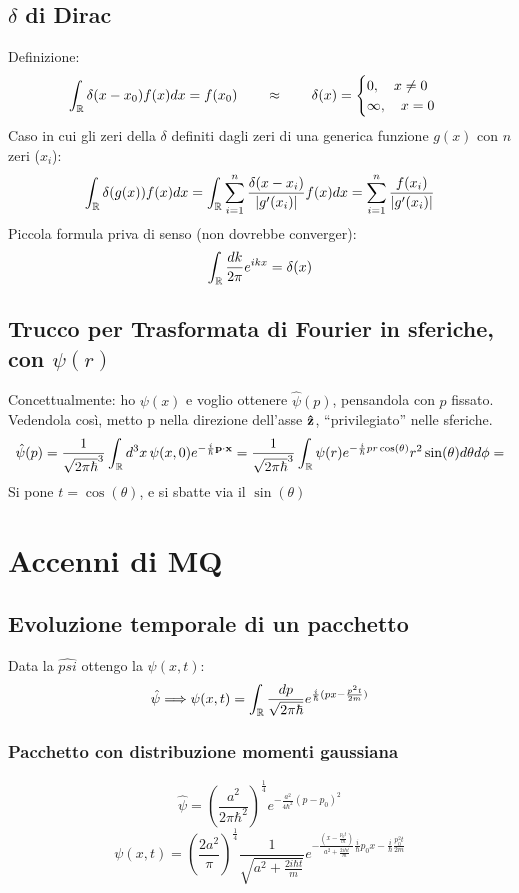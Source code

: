 \subsection{$\delta$ di Dirac}
Definizione:
$$
\int_\mathbb{R} \delta(x-x_0)f(x)dx = f(x_0) \qquad \approx  \qquad 
\delta(x) = \begin{cases}
            0,\quad x\neq0 \\
	    \infty, \quad  x= 0 
\end{cases}
$$
Caso in cui gli zeri della $\delta$ definiti dagli zeri di una generica funzione $g(x)$ con $n$ zeri ($x_i$):
$$
\int_\mathbb{R} \delta(g(x))f(x)dx = \int_\mathbb{R} \sum_{i=1}^n \frac{\delta(x-x_i)}{|g'(x_i)|} f(x) dx = \sum_{i=1}^n \frac{f(x_i)}{|g'(x_i)|}
$$
Piccola formula priva di senso (non dovrebbe converger):
$$ \int_\mathbb{R} \frac{dk}{2 \pi} e^{ikx} = \delta(x) $$
\subsection{Trucco per Trasformata di Fourier in sferiche, con $\psi(r)$}
Concettualmente: ho $\psi(x)$ e voglio ottenere $\hat{\psi}(p)$, pensandola con $p$ fissato. Vedendola così, metto p nella direzione
dell'asse $\mathbf{\hat{z}}$, ``privilegiato'' nelle sferiche.
$$
\hat{\psi}(p)= \frac{1}{\sqrt{2 \pi \hbar}^3} \int_\mathbb{R} d^3 x \, \psi(x,0) e^{-\frac{i}{\hbar} \mathbf{p}\cdot {\ensuremath{\mathbf{x}}}} =
 \frac{1}{\sqrt{2 \pi \hbar}^3} \int_\mathbb{R} \psi(r) e^{-\frac{i}{\hbar} pr \cos(\theta) } r^2 \sin(\theta) d\theta d\phi =
$$  
Si pone $ t = \cos(\theta)$, e si sbatte via il $\sin(\theta)$
\section{Accenni di MQ}
\subsection{Evoluzione temporale di un pacchetto}
Data la $\hat{psi}$ ottengo la $ \psi(x,t)$:
$$
\hat{\psi} \Longrightarrow \psi(x,t) = \int_\mathbb{R} \frac{dp}{\sqrt{2 \pi \hbar}} e^{ \frac{i}{\hbar} (px - \frac{p^2 t}{2m})}
$$
\subsubsection{Pacchetto con distribuzione momenti gaussiana}
$$
\hat{\psi} =  \left( \frac{a^2}{2 \pi \hbar^2}\right)^{\frac{1}{4}} e^{- \frac{a^2}{4 \hbar^2} (p-p_0)^2}
$$
$$
\psi(x,t)= \left(\frac{2a^2}{\pi} \right)^{\frac{1}{4}} \frac{1}{ \sqrt{ a^2 + \frac{ 2 i \hbar t }{m}}} e^{- \frac{(x-\frac{p_0t}{m})}{a^2 + \frac{2i\hbar t}{m}}
\frac{i}{\hbar} p_0 x  - 	\frac{i}{\hbar} 	\frac{p_0^2 t}{2m} }
$$
